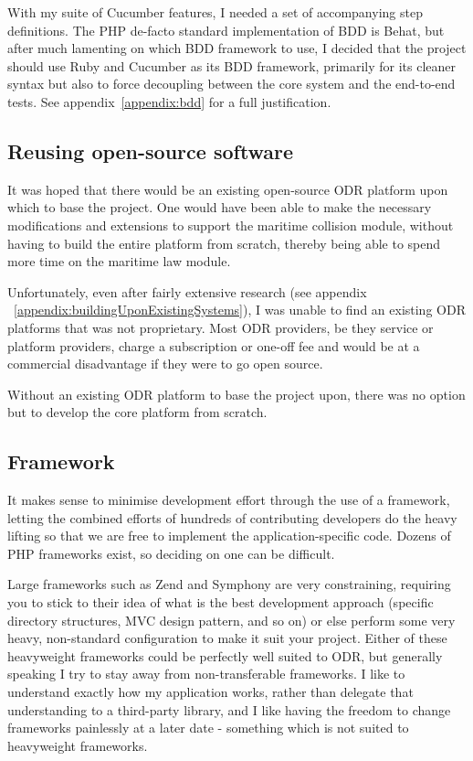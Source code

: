 With my suite of Cucumber features, I needed a set of accompanying step definitions. The PHP de-facto standard implementation of BDD is Behat,  but after much lamenting on which BDD framework to use, I decided that the project should use Ruby and Cucumber as its BDD framework, primarily for its cleaner syntax but also to force decoupling between the core system and the end-to-end tests. See appendix~\ref{appendix:bdd} for a full justification.

\subsection{Reusing open-source software}

It was hoped that there would be an existing open-source ODR platform upon which to base the project. One would have been able to make the necessary modifications and extensions to support the maritime collision module, without having to build the entire platform from scratch, thereby being able to spend more time on the maritime law module.

Unfortunately, even after fairly extensive research (see appendix ~\ref{appendix:buildingUponExistingSystems}), I was unable to find an existing ODR platforms that was not proprietary. Most ODR providers, be they service or platform providers, charge a subscription or one-off fee and would be at a commercial disadvantage if they were to go open source.

Without an existing ODR platform to base the project upon, there was no option but to develop the core platform from scratch.

\subsection{Framework}

It makes sense to minimise development effort through the use of a framework, letting the combined efforts of hundreds of contributing developers do the heavy lifting so that we are free to implement the application-specific code. Dozens of PHP frameworks exist, so deciding on one can be difficult.

Large frameworks such as Zend and Symphony are very constraining, requiring you to stick to their idea of what is the best development approach (specific directory structures, MVC design pattern, and so on) or else perform some very heavy, non-standard configuration to make it suit your project. Either of these heavyweight frameworks could be perfectly well suited to ODR, but generally speaking I try to stay away from non-transferable frameworks. I like to understand exactly how my application works, rather than delegate that understanding to a third-party library, and I like having the freedom to change frameworks painlessly at a later date - something which is not suited to heavyweight frameworks.

